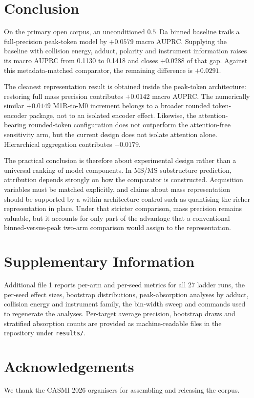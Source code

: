 \documentclass[11pt]{article}
\begin{document}
\section*{Conclusion}
On the primary open corpus, an unconditioned $0.5$~Da binned baseline trails a full-precision peak-token model by $+0.0579$ macro AUPRC. Supplying the baseline with collision energy, adduct, polarity and instrument information raises its macro AUPRC from 0.1130 to 0.1418 and closes $+0.0288$ of that gap. Against this metadata-matched comparator, the remaining difference is $+0.0291$.

The cleanest representation result is obtained inside the peak-token architecture: restoring full mass precision contributes $+0.0142$ macro AUPRC. The numerically similar $+0.0149$ M1R-to-M0 increment belongs to a broader rounded token-encoder package, not to an isolated encoder effect. Likewise, the attention-bearing rounded-token configuration does not outperform the attention-free sensitivity arm, but the current design does not isolate attention alone. Hierarchical aggregation contributes $+0.0179$.

The practical conclusion is therefore about experimental design rather than a universal ranking of model components. In MS/MS substructure prediction, attribution depends strongly on how the comparator is constructed. Acquisition variables must be matched explicitly, and claims about mass representation should be supported by a within-architecture control such as quantising the richer representation in place. Under that stricter comparison, mass precision remains valuable, but it accounts for only part of the advantage that a conventional binned-versus-peak two-arm comparison would assign to the representation.

\section*{Supplementary Information}
Additional file 1 reports per-arm and per-seed metrics for all 27 ladder runs, the per-seed effect sizes, bootstrap distributions, peak-absorption analyses by adduct, collision energy and instrument family, the bin-width sweep and commands used to regenerate the analyses. Per-target average precision, bootstrap draws and stratified absorption counts are provided as machine-readable files in the repository under \texttt{results/}.

\section*{Acknowledgements}
We thank the CASMI 2026 organisers for assembling and releasing the corpus.
\end{document}
